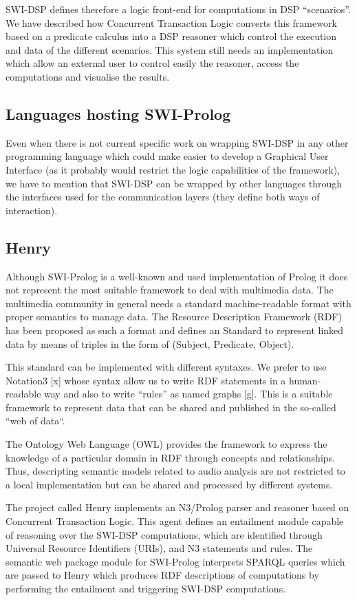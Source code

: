 \documentclass[runningheads]{llncs}
\begin{document}
SWI-DSP defines therefore a logic front-end for computations in DSP ``scenarios''. We have described how Concurrent Transaction Logic converts this framework based on a predicate calculus into a DSP reasoner which control the execution and data of the different scenarios. This system still needs an implementation which allow an external user to control easily the reasoner, access the computations and visualise the results.

\subsection{Languages hosting SWI-Prolog}

Even when there is not current specific work on wrapping SWI-DSP in any other programming language which could make easier to develop a Graphical User Interface (as it probably would restrict the logic capabilities of the framework), we have to mention that SWI-DSP can be wrapped by other languages through the interfaces used for the communication layers (they define both ways of interaction).

\subsection{Henry}\label{subsec:henry}

Although SWI-Prolog is a well-known and used implementation of Prolog it does not represent the most suitable framework to deal with multimedia data. The multimedia community in general needs a standard machine-readable format with proper semantics to manage data. The Resource Description Framework (RDF) has been proposed as such a format and defines an Standard to represent linked data by means of triples in the form of (Subject, Predicate, Object).

This standard can be implemented with different syntaxes. We prefer to use Notation3 [x] whose syntax allow us to write RDF statements in a human-readable way and also to write ``rules'' as named graphs [g]. This is a suitable framework to represent data that can be shared and published in the so-called ``web of data``.

The Ontology Web Language (OWL) provides the framework to express the knowledge of a particular domain in RDF through concepts and relationships. Thus, descripting semantic models related to audio analysis are not restricted to a local implementation but can be shared and processed by different systems.

The project called Henry implements an N3/Prolog parser and reasoner based on Concurrent Transaction Logic. This agent defines an entailment module capable of reasoning over the SWI-DSP computations, which are identified through Universal Resource Identifiers (URIs), and N3 statements and rules. The semantic web package module for SWI-Prolog interprets SPARQL queries which are passed to Henry which produces RDF descriptions of computations by performing the entailment and triggering SWI-DSP computations.
\end{document}
